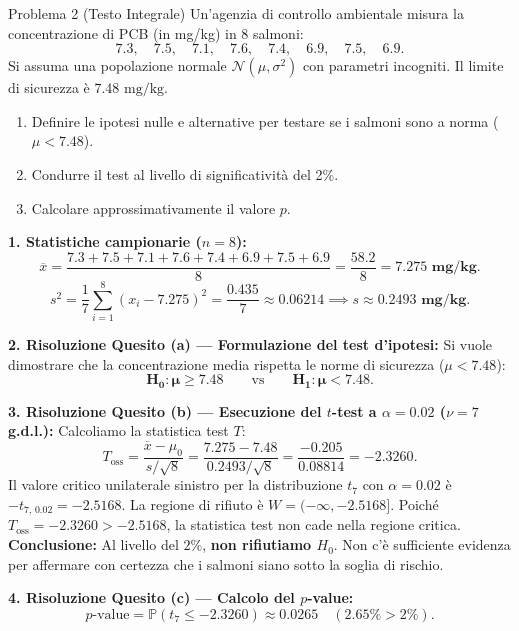 \documentclass[11pt,a4paper]{article}
\newcommand{\Prob}{\mathbb{P}}
\begin{document}
\begin{problemabox}{Problema 2 (Testo Integrale)}
Un'agenzia di controllo ambientale misura la concentrazione di PCB (in mg/kg) in 8 salmoni:
\[
7.3, \quad 7.5, \quad 7.1, \quad 7.6, \quad 7.4, \quad 6.9, \quad 7.5, \quad 6.9.
\]
Si assuma una popolazione normale $\mathcal{N}(\mu, \sigma^2)$ con parametri incogniti. Il limite di sicurezza è $7.48\text{ mg/kg}$.
\begin{enumerate}[label=(\alph*)]
    \item Definire le ipotesi nulle e alternative per testare se i salmoni sono a norma ($\mu < 7.48$).
    \item Condurre il test al livello di significatività del 2\%.
    \item Calcolare approssimativamente il valore $p$.
\end{enumerate}
\end{problemabox}

\begin{soluzionebox}
\textbf{1. Statistiche campionarie ($n = 8$):}
\[
\overline{x} = \frac{7.3 + 7.5 + 7.1 + 7.6 + 7.4 + 6.9 + 7.5 + 6.9}{8} = \frac{58.2}{8} = \mathbf{7.275\text{ mg/kg}}.
\]
\[
s^2 = \frac{1}{7} \sum_{i=1}^8 (x_i - 7.275)^2 = \frac{0.435}{7} \approx 0.06214 \implies s \approx \mathbf{0.2493\text{ mg/kg}}.
\]

\textbf{2. Risoluzione Quesito (a) --- Formulazione del test d'ipotesi:}
Si vuole dimostrare che la concentrazione media rispetta le norme di sicurezza ($\mu < 7.48$):
\[
\mathbf{H_0: \mu \ge 7.48} \qquad \text{vs} \qquad \mathbf{H_1: \mu < 7.48}.
\]

\textbf{3. Risoluzione Quesito (b) --- Esecuzione del $t$-test a $\alpha = 0.02$ ($\nu = 7$ g.d.l.):}
Calcoliamo la statistica test $T$:
\[
T_{\text{oss}} = \frac{\overline{x} - \mu_0}{s/\sqrt{8}} = \frac{7.275 - 7.48}{0.2493/\sqrt{8}} = \frac{-0.205}{0.08814} = \mathbf{-2.3260}.
\]
Il valore critico unilaterale sinistro per la distribuzione $t_7$ con $\alpha = 0.02$ è $-t_{7, \, 0.02} = -2.5168$.
La regione di rifiuto è $W = (-\infty, -2.5168]$.
Poiché $T_{\text{oss}} = -2.3260 > -2.5168$, la statistica test non cade nella regione critica.
\textbf{Conclusione:} Al livello del $2\%$, \textbf{non rifiutiamo $H_0$}. Non c'è sufficiente evidenza per affermare con certezza che i salmoni siano sotto la soglia di rischio.

\textbf{4. Risoluzione Quesito (c) --- Calcolo del $p$-value:}
\[
p\text{-value} = \Prob(t_7 \le -2.3260) \approx \mathbf{0.0265} \quad (\mathbf{2.65\%} > 2\%).
\]
\end{soluzionebox}
\end{document}
